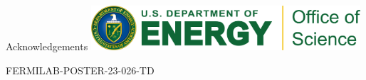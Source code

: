 \documentclass{beamer}
\begin{document}
\begin{frame}{}
\begin{columns}[t]
\begin{column}{0.32\textwidth}
\begin{block}{\label{sec:acknowledgements}Acknowledgements}
                    \centering \includegraphics[width=10cm]{logos/RGB_Color-Seal_Green-Mark_SC_Horizontal.png}


                    FERMILAB-POSTER-23-026-TD
                \end{block}
            \end{column}
        \end{columns}
    \end{frame}
\end{document}
